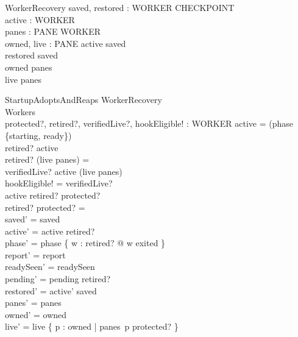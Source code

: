 \documentclass[a4paper,10pt,fleqn]{article}
\begin{document}
\begin{schema}{WorkerRecovery}
  saved, restored : WORKER \pfun CHECKPOINT \\
  active : \power WORKER \\
  panes : PANE \pfun WORKER \\
  owned, live : \power PANE
\where
  active \subseteq \dom saved \\
  restored \subseteq saved \\
  owned \subseteq \dom panes \\
  live \subseteq \dom panes
\end{schema}

\begin{schema}{StartupAdoptsAndReaps}
  \Delta WorkerRecovery \\
  \Delta Workers \\
  protected?, retired?, verifiedLive?, hookEligible! : \power WORKER
\where
  active = \dom (phase \rres \{starting, ready\}) \\
  retired? \subseteq active \\
  retired? \cap \ran (live \dres panes) = \emptyset \\
  verifiedLive? \subseteq active \cap \ran (live \dres panes) \\
  hookEligible! = verifiedLive? \\
  active \setminus retired? \subseteq protected? \\
  retired? \cap protected? = \emptyset \\
  saved' = saved \\
  active' = active \setminus retired? \\
  phase' = phase \oplus \{ w : retired? @ w \mapsto exited \} \\
  report' = report \\
  readySeen' = readySeen \\
  pending' = pending \cup retired? \\
  restored' = active' \dres saved \\
  panes' = panes \\
  owned' = owned \\
  live' = live \setminus \{ p : owned | panes~p \notin protected? \}
\end{schema}
\end{document}
